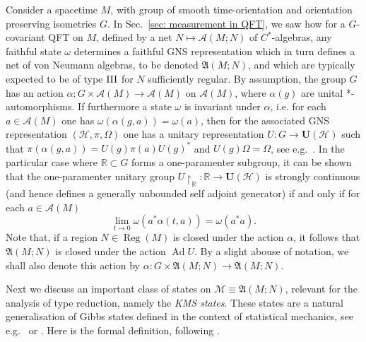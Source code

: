 \documentclass[sn-mathphys-num]{sn-jnl}%
\newcommand{\RR}{\mathbb{R}}
\newcommand{\HH}{\mathcal{H}}
\newcommand{\Af}{\mathscr{A}}
\DeclareMathOperator{\Ad}{Ad}
\DeclareMathOperator{\Reg}{Reg}
\numberwithin{equation}{section}
\theoremstyle{thmstyleone}%
\theoremstyle{thmstyletwo}%
\theoremstyle{thmstylethree}%
\begin{document}
Consider a spacetime $M$, with group of smooth time-orientation and orientation preserving isometries $G$.
In Sec.~\ref{sec: measurement in QFT}, we saw how for a $G$-covariant QFT on $M$, defined by a net $N\mapsto\Af(M;N)$ of $C^*$-algebras, any faithful state $\omega$ determines a faithful GNS representation which in turn defines a net of von Neumann algebras, to be denoted $\mathfrak{A}(M;N)$, and which are typically expected to be of type $\textnormal{III}$ for $N$ sufficiently regular. By assumption, the group $G$ has an action $\alpha:G\times \Af(M)\to \Af(M)$ on $\Af(M)$, where $\alpha(g)$ are unital *-automorphisms. If furthermore a state $\omega$ is invariant under $\alpha$, i.e. for each $a\in \Af(M)$ one has $\omega(\alpha(g,a))=\omega(a)$, then for the associated GNS representation $(\HH,\pi,\Omega)$ one has a unitary representation $U:G\to \mathbf{U}(\HH)$ such that $\pi(\alpha(g,a))=U(g)\pi(a)U(g)^*$ and $U(g)\Omega=\Omega$, see e.g.\ \cite[Prop.\ 5.1.17]{AdvAQFT}. In the particular case where $\RR\subset G$ forms a one-paramenter subgroup, it can be shown that the one-paramenter unitary group $U\restriction_\RR:\RR\to \mathbf{U}(\HH)$ is strongly continuous (and hence defines a generally unbounded self adjoint generator) if and only if for each $a\in \Af(M)$ 
\begin{equation}
\label{eq:strong_cont_action}
    \lim_{t\to 0}\omega(a^*\alpha(t,a))=\omega(a^*a).
\end{equation}
Note that, if a region $N\in \Reg(M)$ is closed under the action $\alpha$, it follows that $\mathfrak{A}(M;N)$ is closed under the action $\Ad U$. By a slight abouse of notation, we shall also denote this action by $\alpha:G\times \mathfrak{A}(M;N)\to \mathfrak{A}(M;N)$.


Next we discuss an important class of states on $\mathcal{M}\equiv \mathfrak{A}(M;N)$, relevant for the analysis of type reduction, namely the \emph{KMS states}. These states are a natural generalisation of Gibbs states defined in the context of statistical mechanics, see e.g.\ \cite{cmp/1103840050} or \cite[Ch.\ V.1]{Haag:book}. Here is the formal definition, following \cite[Def.~5.3.1 and Prop.~5.3.7]{Bratteli2}.
\end{document}
